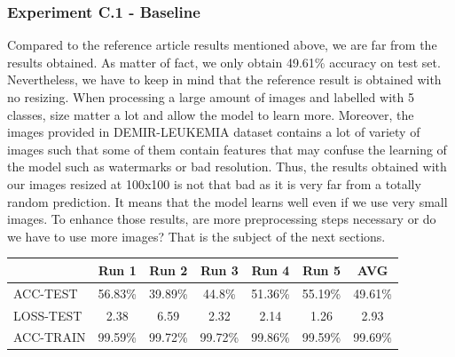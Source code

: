 \documentclass[11pt, openany]{report}
\theoremstyle{plain}
\theoremstyle{definition}
\theoremstyle{remark}
\begin{document}
\subsubsection{Experiment C.1 - Baseline}
Compared to the reference article \cite{leukemia} results mentioned above, we are far from the results obtained. As matter of fact, we only obtain 49.61\% accuracy on test set. Nevertheless, we have to keep in mind that the reference result is obtained with no resizing. When processing a large amount of images and labelled with 5 classes, size matter a lot and allow the model to learn more. Moreover, the images provided in DEMIR-LEUKEMIA dataset contains a lot of variety of images such that some of them contain features that may confuse the learning of the model such as watermarks or bad resolution. Thus, the results obtained with our images resized at 100x100 is not that bad as it is very far from a totally random prediction. It means that the model learns well even if we use very small images. To enhance those results, are more preprocessing steps necessary or do we have to use more images? That is the subject of the next sections.      

\begin{center}
\begin{tabular}{|l|c|c|c|c|c|c|}
  \hline
   & \textbf{Run 1} & \textbf{Run 2} & \textbf{Run 3} & \textbf{Run 4} & \textbf{Run 5} & \textbf{AVG}\\
  \hline
  ACC-TEST & 56.83\% & 39.89\% & 44.8\% & 51.36\% & 55.19\% & 49.61\% \\
  LOSS-TEST & 2.38 & 6.59 & 2.32 & 2.14  & 1.26 & 2.93 \\ 
  ACC-TRAIN & 99.59\% & 99.72\% & 99.72\% & 99.86\% & 99.59\% & 99.69\% \\ 
  \hline
\end{tabular}
\label{table:results-C1}
\end{center}
\end{document}
